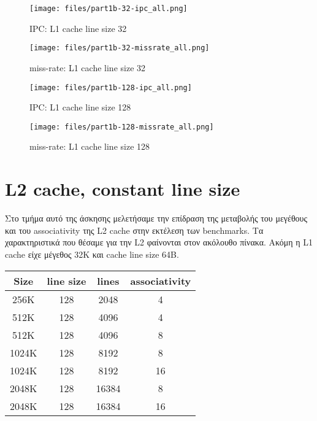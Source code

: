 \documentclass[a4paper,12pt]{article}
\begin{document}
\begin{figure}[H]
    \centering
    \texttt{[image: files/part1b-32-ipc\_all.png]}
    \caption{IPC: L1 cache line size 32}
\end{figure}

\begin{figure}[H]
    \centering
    \texttt{[image: files/part1b-32-missrate\_all.png]}
    \caption{miss-rate: L1 cache line size 32}
\end{figure}

\begin{figure}[H]
    \centering
    \texttt{[image: files/part1b-128-ipc\_all.png]}
    \caption{IPC: L1 cache line size 128}
\end{figure}

\begin{figure}[H]
    \centering
    \texttt{[image: files/part1b-128-missrate\_all.png]}
    \caption{miss-rate: L1 cache line size 128}
\end{figure}


\pagebreak


\section{L2 cache, constant line size}
Στο τμήμα αυτό της άσκησης μελετήσαμε την επίδραση της μεταβολής του μεγέθους
και του associativity της L2 cache στην εκτέλεση των benchmarks. Τα
χαρακτηριστικά που θέσαμε για την L2 φαίνονται στον ακόλουθο πίνακα. Ακόμη
η L1 cache είχε μέγεθος 32K και cache line size 64B.

\begin{table}[H]
    \centering
    \begin{tabular}{c c c c}
        Size & line size & lines & associativity\\ 
        \hline
        \hline
        256K   & 128 & 2048  & 4\\
        \hline
        512K   & 128 & 4096  & 4\\
        512K   & 128 & 4096  & 8\\
        \hline
        1024K  & 128 & 8192  & 8\\
        1024K  & 128 & 8192  & 16\\
        \hline
        2048K  & 128 & 16384 & 8\\
        2048K  & 128 & 16384 & 16\\
    \end{tabular}
\end{table}
\end{document}
